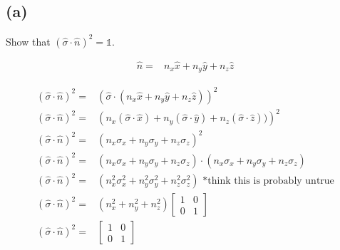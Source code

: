 \documentclass[12pt, a4paper]{article}
\begin{document}
\subsection*{(a)}
Show that $(\hat{\sigma}\cdot\hat{n})^2 = \mathds{1}$.

\begin{align*}
\hat{n} =& n_x\hat{x} + n_y\hat{y} + n_z\hat{z}
\end{align*}

\begin{align*}
(\hat{\sigma}\cdot\hat{n})^2 =& 
\left(\hat{\sigma} \cdot (n_x\hat{x} + n_y\hat{y} + n_z\hat{z})\right)^2
\\
(\hat{\sigma}\cdot\hat{n})^2 =& 
\left(n_x (\hat{\sigma}\cdot\hat{x}) + n_y(\hat{\sigma}\cdot\hat{y}) + n_z(\hat{\sigma}\cdot\hat{z}))\right)^2
\\
(\hat{\sigma}\cdot\hat{n})^2 =& 
\left(n_x\sigma_x + n_y\sigma_y + n_z\sigma_z\right)^2
\\
(\hat{\sigma}\cdot\hat{n})^2 =& 
\left(n_x\sigma_x + n_y\sigma_y + n_z\sigma_z\right)
\cdot \left(n_x\sigma_x + n_y\sigma_y + n_z\sigma_z\right) 
\\
(\hat{\sigma}\cdot\hat{n})^2 =& 
\left(n_x^2\sigma_x^2 + n_y^2\sigma_y^2 + n_z^2\sigma_z^2\right)\text{ *think this is probably untrue}
\\
(\hat{\sigma}\cdot\hat{n})^2 =& 
\left(n_x^2 + n_y^2 + n_z^2\right)
\begin{bmatrix}
1&0\\0&1
\end{bmatrix}
\\
(\hat{\sigma}\cdot\hat{n})^2 =& 
\begin{bmatrix}
1&0\\0&1
\end{bmatrix}
\\
\end{align*}
\end{document}
